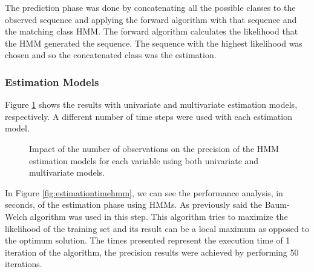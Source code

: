 The prediction phase was done by concatenating all the possible classes to the observed sequence and applying the forward
 algorithm with that sequence and the matching class HMM. The forward algorithm calculates the likelihood that the HMM 
 generated the sequence. The sequence with the highest likelihood was chosen and so the concatenated class was the estimation.

\subsubsection{Estimation Models}
\label{subsubsection:estimation_hmm}

Figure \ref{fig:estimationhmm} shows the results with univariate and multivariate estimation models,
 respectively. A different number of time steps were used with each estimation model.
 
 \begin{figure}[h]
  \begin{subfigmatrix}{2}
  \end{subfigmatrix}
  \caption{Impact of the number of observations on the precision of the HMM estimation models for each variable using both univariate and multivariate models.}
  \label{fig:estimationhmm}
\end{figure}
 
 In Figure \ref{fig:estimationtimehmm}, we can see the performance analysis, in seconds, of the estimation phase using HMMs. As previously said the Baum-Welch algorithm was used in this step. This algorithm tries to maximize the likelihood of the training set and its result can be a local maximum as opposed to the optimum solution. The times presented represent the execution time of 1 iteration of the algorithm, the precision results were achieved by performing 50 iterations.

